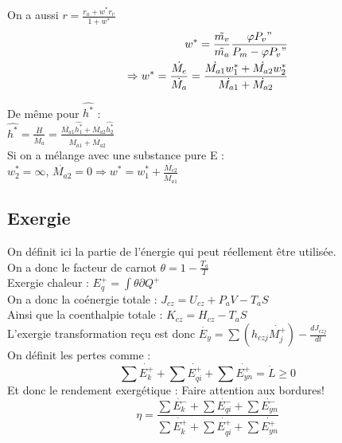 \documentclass[../main.tex]{subfiles}
\begin{document}
On a aussi $r = \frac{r_a + w^*r_v}{1+w^*}$\\

\begin{equation}
\begin{split}
        w^* = \frac{\Tilde{m_v}}{\Tilde{m_a}} \frac{\varphi P_v"}{P_m - \varphi P_v"}\\
        \Rightarrow w^* = \frac{\dot{M_e}}{\dot{M_a}} = \frac{\dot{M_{a1}} w_1^* + \dot{M_{a2}} w_2^*}{\dot{M_{a1}} + \dot{M_{a2}}}
\end{split}
\end{equation}

De même pour $\hat{h^*}$ : \\
$\hat{h^*} = \frac{\dot{H}}{\dot{M_a}} = \frac{\dot{M_{a1}} \hat{h_1^*} + \dot{M_{a2}} \hat{h_2^*}}{\dot{M_{a1} + \dot{M_{a2}}}}$\\

Si on a mélange avec une substance pure E :\\
$w_2^* = \infty$, $\dot{M_{a2}} = 0 \Rightarrow w^* = w_1^* + \frac{\dot{M_{e2}}}{\dot{M_{a1}}}$\\

\subsection{Exergie}

On définit ici la partie de l'énergie qui peut réellement être utilisée.\\
On a donc le facteur de carnot $\theta = 1-\frac{T_a}{T}$\\
Exergie chaleur : $E_q^+ = \int \theta \partial Q^+$\\
On a donc la coénergie totale : $J_{cz} = U_{cz} + P_aV - T_aS$\\
Ainsi que la coenthalpie totale : $K_{cz} = H_{cz} - T_aS$\\

L'exergie transformation reçu est donc $\dot{E_y} = \sum (h_{czj} \dot{M_j^+}) - \frac{dJ_{czj}}{dt}$\\

On définit les pertes comme : \\
\begin{equation}
    \sum \dot{E^+_k} + \sum \dot{E^+_{qi}} + \sum \dot{E^+_{yn}} = \dot{L} \geq 0
\end{equation}
Et donc le rendement exergétique : \warning Faire attention aux bordures!\\

\begin{equation}
    \eta = \frac{\sum \dot{E^-_k} + \sum \dot{E^-_{qi}} + \sum \dot{E^-_{yn}}}{\sum \dot{E^+_k} + \sum \dot{E^+_{qi}} + \sum \dot{E^+_{yn}}}
\end{equation}
\end{document}
